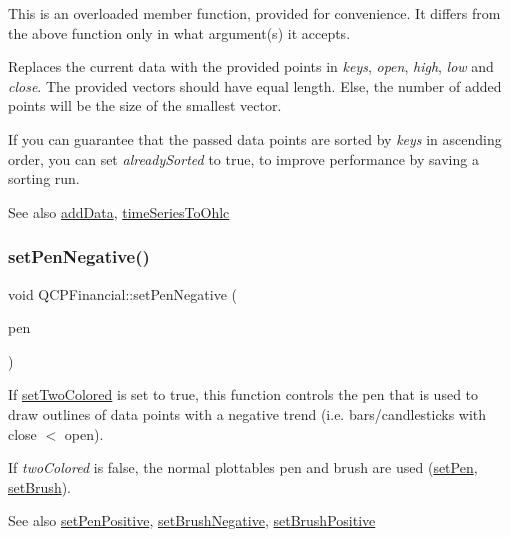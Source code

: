 This is an overloaded member function, provided for convenience. It differs from the above function only in what argument(s) it accepts.

Replaces the current data with the provided points in {\itshape keys}, {\itshape open}, {\itshape high}, {\itshape low} and {\itshape close}. The provided vectors should have equal length. Else, the number of added points will be the size of the smallest vector.

If you can guarantee that the passed data points are sorted by {\itshape keys} in ascending order, you can set {\itshape already\+Sorted} to true, to improve performance by saving a sorting run.

\begin{DoxySeeAlso}{See also}
\hyperlink{class_q_c_p_financial_a372ac031e44a7a6c912d203556af96f7}{add\+Data}, \hyperlink{class_q_c_p_financial_a9a058c035040d3939b8884f4aaccb1a7}{time\+Series\+To\+Ohlc} 
\end{DoxySeeAlso}
\mbox{\label{class_q_c_p_financial_afe5c07e94ccea01a75b3a2476993c346}} 
\subsubsection{\texorpdfstring{set\+Pen\+Negative()}{setPenNegative()}}
{\footnotesize\ttfamily void Q\+C\+P\+Financial\+::set\+Pen\+Negative (\begin{DoxyParamCaption}\item[{const Q\+Pen \&}]{pen }\end{DoxyParamCaption})}

If \hyperlink{class_q_c_p_financial_a138e44aac160a17a9676652e240c5f08}{set\+Two\+Colored} is set to true, this function controls the pen that is used to draw outlines of data points with a negative trend (i.\+e. bars/candlesticks with close $<$ open).

If {\itshape two\+Colored} is false, the normal plottable\textquotesingle{}s pen and brush are used (\hyperlink{class_q_c_p_abstract_plottable_ab74b09ae4c0e7e13142fe4b5bf46cac7}{set\+Pen}, \hyperlink{class_q_c_p_abstract_plottable_a7a4b92144dca6453a1f0f210e27edc74}{set\+Brush}).

\begin{DoxySeeAlso}{See also}
\hyperlink{class_q_c_p_financial_ac58aa3adc7a35aab0088764b840683e5}{set\+Pen\+Positive}, \hyperlink{class_q_c_p_financial_a8bbdd87629f9144b3ef51af660c0961a}{set\+Brush\+Negative}, \hyperlink{class_q_c_p_financial_a5ebff2b1764efd07cc44942e67821829}{set\+Brush\+Positive} 
\end{DoxySeeAlso}
\mbox{\label{class_q_c_p_financial_ac58aa3adc7a35aab0088764b840683e5}} 
